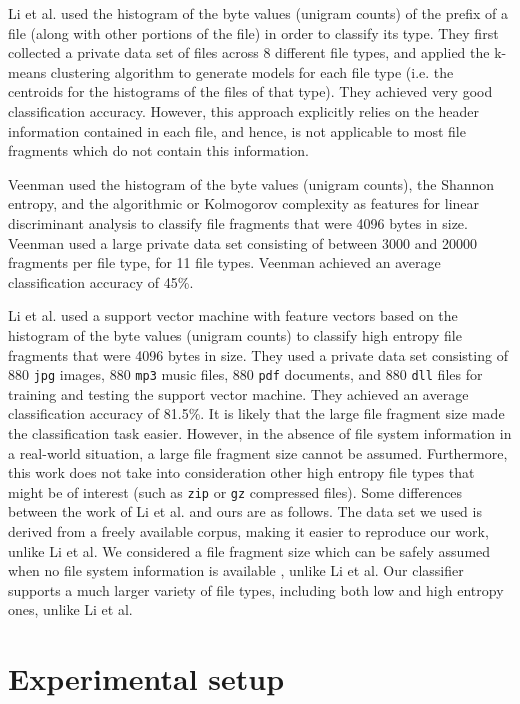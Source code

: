 \documentclass[5p]{elsarticle}
\begin{document}
Li et al. \cite{Li05} used the histogram of the byte values (unigram counts) of the prefix of a file (along with other portions of the file) in order to classify its type. They first collected a private data set of files across 8 different file types, and applied the k-means clustering algorithm to generate models for each file type (i.e. the centroids for the histograms of the files of that type). They achieved very good classification accuracy. However, this approach explicitly relies on the header information contained in each file, and hence, is not applicable to most file fragments which do not contain this information.

Veenman \cite{Veenman07} used the histogram of the byte values (unigram counts), the Shannon entropy, and the algorithmic or Kolmogorov complexity \cite{Kolmogorov65, Lempel76} as features for linear discriminant analysis to classify file fragments that were 4096 bytes in size. Veenman used a large private data set consisting of between 3000 and 20000 fragments per file type, for 11 file types. Veenman achieved an average classification accuracy of 45\%.

Li et al. \cite{Li10} used a support vector machine with feature vectors based on the histogram of the byte values (unigram counts) to classify high entropy file fragments that were 4096 bytes in size. They used a private data set consisting of 880 \texttt{jpg} images, 880 \texttt{mp3} music files, 880 \texttt{pdf} documents, and 880 \texttt{dll} files for training and testing the support vector machine. They achieved an average classification accuracy of 81.5\%. It is likely that the large file fragment size made the classification task easier. However, in the absence of file system information in a real-world situation, a large file fragment size cannot be assumed. Furthermore, this work does not take into consideration other high entropy file types that might be of interest (such as \texttt{zip} or \texttt{gz} compressed files). Some differences between the work of Li et al. and ours are as follows. The data set we used is derived from a freely available corpus, making it easier to reproduce our work, unlike Li et al. We considered a file fragment size which can be safely assumed when no file system information is available \cite{Axelsson10}, unlike Li et al. Our classifier supports a much larger variety of file types, including both low and high entropy ones, unlike Li et al.

\section{Experimental setup}
\label{Section:ExperimentalSetup}
\end{document}

